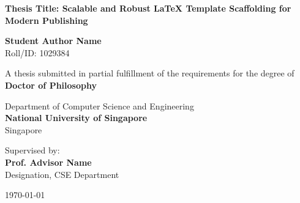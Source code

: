 \begin{titlepage}
\begin{center}
    \vspace*{1cm}
    
    
    \vspace{1.5cm}
    
    {\huge \bfseries \color{primary} Thesis Title: Scalable and Robust LaTeX Template Scaffolding for Modern Publishing}
    
    \vspace{1.5cm}
    
    {\Large \bfseries Student Author Name} \\
    \vspace{0.2cm}
    {Roll/ID: 1029384}
    
    \vspace{1.5cm}
    
    {A thesis submitted in partial fulfillment of the requirements for the degree of} \\
    \vspace{0.3cm}
    {\large \bfseries \color{secondary} Doctor of Philosophy}
    
    \vspace{1.5cm}
    
    {\large Department of Computer Science and Engineering} \\
    \vspace{0.2cm}
    {\large \bfseries \color{primary} National University of Singapore} \\
    \vspace{0.1cm}
    {Singapore}
    
    \vfill
    
    {Supervised by:} \\
    {\large \bfseries Prof. Advisor Name} \\
    {Designation, CSE Department}
    
    \vspace{1cm}
    
    {\large \today}
    
\end{center}
\end{titlepage}
